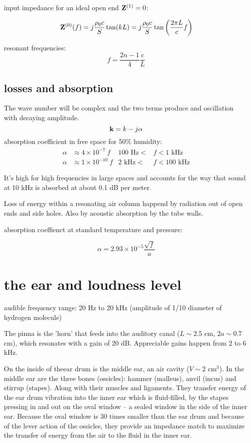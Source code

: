 \documentclass[10pt, a4paper, twocolumn]{article}
\begin{document}
input impedance for an ideal open end $\vb Z^{(1)}=0$:

\[\vb Z^{(0)}(f)=j\frac{\rho _0c}{S}\tan(kL)
=j\frac{\rho _0c}{S}\tan\qty(\frac{2\pi L}{c}f)\]

resonant frequencies:
\[f=\frac{2n-1}{4}\frac{c}{L}\]

\subsection{losses and absorption}

The wave number will be complex and the two terms produce and oscillation with decaying amplitude.
\[\vb k=k-j\alpha\]
absorption coefficient in free space for 50\% humidity:
\begin{equation*}
\begin{aligned}
\alpha &\approx 4\times 10^{-7}\ f
& 100 \text{ Hz} <&f<1\text{ kHz}
\\ \alpha &\approx 1\times 10^{-10}\ f
& 2 \text{ kHz} <&f<100\text{ kHz}
\end{aligned}
\end{equation*}

It's high for high frequencies in large spaces and accounts for the way that sound at 10 kHz is absorbed at about 0.1 dB per meter.

Loss of energy within a resonating air column happend by radiation out of open ends and side holes. Also by acoustic absorption by the tube walls. 

absorption coeffienct at standard temperature and pressure:

\[\alpha =2.93\times 10^{-5}\frac{\sqrt f}{a}\]

\section{the ear and loudness level}

audible frequency range: 20 Hz to 20 kHz
(amplitude of 1/10 diameter of hydrogen molecule)

The pinna is the 'horn' that feeds into the auditory canal ($L\sim$2.5 cm, $2a\sim$0.7 cm), which resonates with a gain of 20 dB. Appreciable gains happen from 2 to 6 kHz.

On the inside of theear drum is the middle ear, an air cavity ($V\sim 2\text{ cm}^3$). In the middle ear are the three bones (ossicles): hammer (malleus), anvil (incus) and stirrup (stapes). Along with their muscles and ligaments. They transfer energy of the ear drum vibration into the inner ear which is fluid-filled, by the stapes pressing in and out on the oval window -- a sealed window in the side of the inner ear. Because the oval window is 30 times smaller than the ear drum and because of the lever action of the ossicles, they provide an impedance match to maximize the transfer of energy from the air to the fluid in the inner ear.
\end{document}
